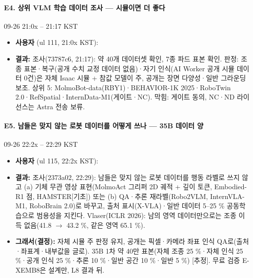\paragraph{E4. 상위 VLM 학습 데이터 조사 --- 시뮬이면 더 좋다}
{\small 09-26 21:0x -- 21:17 KST}
\begin{itemize}
  \item \textbf{사용자} (ul 111, 21:0x KST): 
  \item \textbf{결과:} 조사(73787c6, 21:17): 약 40개 데이터셋 확인, 7종 파드 표본 확인. 판정: 조종 표본·복구(공개 수치 교정 데이터 없음)·자기 인식(AI Worker 공개 시뮬 데이터 0건)은 자체 Isaac 시뮬 + 참값 모델이 주, 공개는 장면 다양성·일반 그라운딩 보조. 상위 5: MolmoBot-data(RBY1)·BEHAVIOR-1K 2025·RoboTwin 2.0·RefSpatial·InternData-M1(게이트·NC). 막힘: 게이트 동의, NC·ND 라이선스는 Astra 전송 보류.
\end{itemize}

\paragraph{E5. 남들은 맞지 않는 로봇 데이터를 어떻게 쓰나 --- 35B 데이터 양}
{\small 09-26 22:2x -- 22:29 KST}
\begin{itemize}
  \item \textbf{사용자} (ul 115, 22:2x KST): 
  \item \textbf{결과:} 조사(2373a02, 22:29): 남들은 맞지 않는 로봇 데이터를 행동 라벨로 쓰지 않고 (a) 기체 무관 영상 표현(MolmoAct 그리퍼 2D 궤적 + 깊이 토큰, Embodied-R1 점, HAMSTER[기초]) 또는 (b) QA·추론 재라벨(Robo2VLM, InternVLA-M1, RoboBrain 2.0)로 바꾸고, 출처 표시(X-VLA)·일반 데이터 5--25 \% 공동학습으로 범용성을 지킨다. Vlaser(ICLR 2026): 남의 영역 데이터만으로는 조종 이득 없음(41.8 $\rightarrow$ 43.2 \%, 같은 영역 65.1 \%).
  \item \textbf{그래서(결정):} 자체 시뮬 주 판정 유지, 공개는 픽셀·카메라 좌표 인식 QA로(출처·좌표계·내부값을 글로). 35B 1차 약 40만 표본(자체 조종 25 \%·자체 인식 25 \%·공개 인식 25 \%·추론 10 \%·일반 공간 10 \%·일반 5 \%) [추정]. 무료 검증 E-XEMB8은 설계만, L8 결과 뒤.
\end{itemize}

